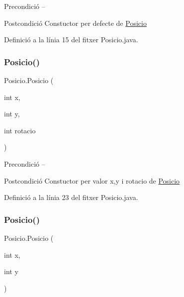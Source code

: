\begin{DoxyPrecond}{Precondició}
-- 
\end{DoxyPrecond}
\begin{DoxyPostcond}{Postcondició}
Constuctor per defecte de \mbox{\hyperlink{class_posicio}{Posicio}} 
\end{DoxyPostcond}


Definició a la línia 15 del fitxer Posicio.\+java.

\mbox{\label{class_posicio_a3b96d8c2e418d9ea137952db741ccc43}} 
\subsubsection{\texorpdfstring{Posicio()}{Posicio()}\hspace{0.1cm}{\footnotesize\ttfamily [2/3]}}
{\footnotesize\ttfamily Posicio.\+Posicio (\begin{DoxyParamCaption}\item[{int}]{x,  }\item[{int}]{y,  }\item[{int}]{rotacio }\end{DoxyParamCaption})}

\begin{DoxyPrecond}{Precondició}
-- 
\end{DoxyPrecond}
\begin{DoxyPostcond}{Postcondició}
Constuctor per valor x,y i rotacio de \mbox{\hyperlink{class_posicio}{Posicio}} 
\end{DoxyPostcond}


Definició a la línia 23 del fitxer Posicio.\+java.

\mbox{\label{class_posicio_ae06a3e02ea3f31a2f3863ffdb43deb4b}} 
\subsubsection{\texorpdfstring{Posicio()}{Posicio()}\hspace{0.1cm}{\footnotesize\ttfamily [3/3]}}
{\footnotesize\ttfamily Posicio.\+Posicio (\begin{DoxyParamCaption}\item[{int}]{x,  }\item[{int}]{y }\end{DoxyParamCaption})}

